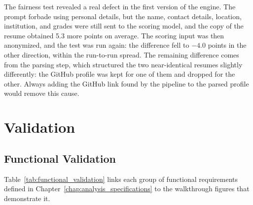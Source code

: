 The fairness test revealed a real defect in the first version of the engine. The prompt forbade using personal details, but the name, contact details, location, institution, and grades were still sent to the scoring model, and the copy of the resume obtained 5.3 more points on average. The scoring input was then anonymized, and the test was run again: the difference fell to $-4.0$ points in the other direction, within the run-to-run spread. The remaining difference comes from the parsing step, which structured the two near-identical resumes slightly differently: the GitHub profile was kept for one of them and dropped for the other. Always adding the GitHub link found by the pipeline to the parsed profile would remove this cause.

\section{Validation}
\label{sec:validation}

\subsection{Functional Validation}
\label{subsec:functional_validation}

Table~\ref{tab:functional_validation} links each group of functional requirements defined in Chapter~\ref{chap:analysis_specifications} to the walkthrough figures that demonstrate it.

